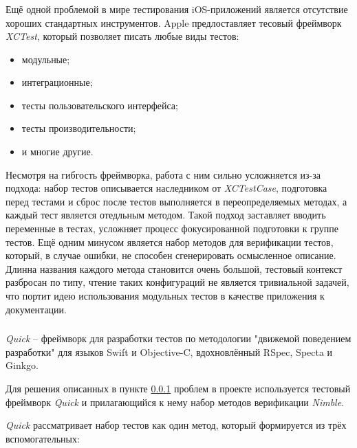 \subsubsection{}
\label{sec:testing:tech:xctest}

Ещё одной проблемой в мире тестирования iOS-приложений является отсутствие хороших стандартных инструментов. Apple предлоставляет тесовый фреймворк \textit{XCTest}, который позволяет писать любые виды тестов:

\begin{itemize}
	\item модульные;
	\item интеграционные;
	\item тесты пользовательского интерфейса;
	\item тесты производительности;
	\item и многие другие.
\end{itemize}

Несмотря на гибгость фреймворка, работа с ним сильно усложняется из-за подхода: набор тестов описывается наследником от \textit{XCTestCase}, подготовка перед тестами и сброс после тестов выполняется в переопределяемых методах, а каждый тест является отедльным методом. Такой подход заставляет вводить переменные в тестах, усложняет процесс фокусированной подготовки к группе тестов. Ещё одним минусом является набор методов для верификации тестов, который, в случае ошибки, не способен сгенерировать осмысленное описание. Длинна названия каждого метода становится очень большой, тестовый контекст разбросан по типу, чтение таких конфигураций не является тривиальной задачей, что портит идею использования модульных тестов в качестве приложения к документации.

\subsubsection{}
\label{sec:testing:tech:quick}
\textit{Quick} -- фреймворк для разработки тестов по методологии "движемой поведением разработки" для языков Swift и Objective-C, вдохновлённый RSpec, Specta и Ginkgo. \cite{github:quick}

Для решения описанных в пункте \ref{sec:testing:tech:xctest} проблем в проекте используется тестовый фреймворк \textit{Quick} и прилагающийся к нему набор методов верификации \textit{Nimble}.

\textit{Quick} рассматривает набор тестов как один метод, который формируется из трёх вспомогательных:

